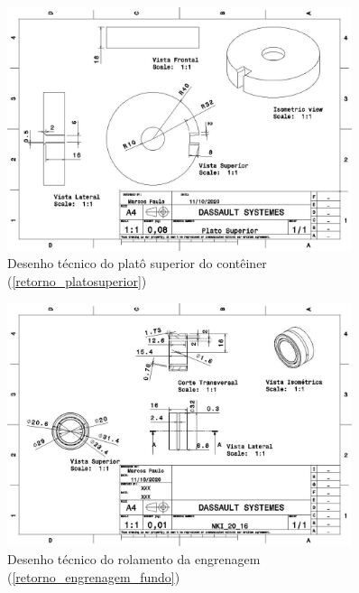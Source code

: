 \begin{apendicesenv}
\begin{figure}[H]
    \centering
    \includegraphics[width=0.9\textwidth]{figuras/estrutura/Desenhos/Plato_Superior.jpg}
    \caption{Desenho técnico do platô superior do contêiner (\ref{retorno_platosuperior})}
    \label{fig:platosuperior}
\end{figure}

\begin{figure}[H]
    \centering
    \includegraphics[width=0.9\textwidth]{figuras/estrutura/Desenhos/Rolamento_engrenagem.jpg}
    \caption{Desenho técnico do rolamento da engrenagem (\ref{retorno_engrenagem_fundo})}
    \label{fig:rolamento_engrenagem}
\end{figure}


\end{apendicesenv}
